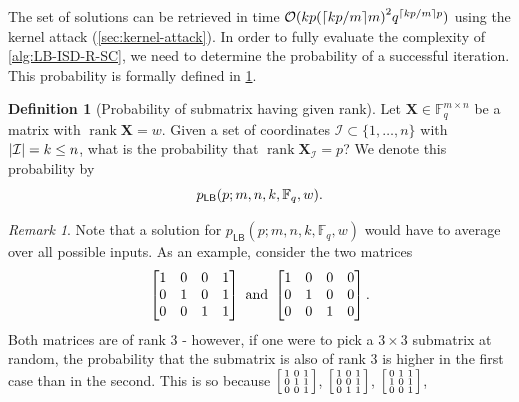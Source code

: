 \documentclass[version=last, paper=A4, parskip=half, oneside]{scrbook}
\theoremstyle{plain}
\theoremstyle{definition}
\newtheorem{definition}{Definition}
\theoremstyle{remark}
\newtheorem*{remark}{Remark}
\newcommand*{\mat}{\symbf}
\DeclareMathOperator{\rank}{rank}
\newcommand*{\FF}{\ensuremath{\mathbb{F}}}
\DeclarePairedDelimiter{\ceil}{\lceil}{\rceil}
\DeclarePairedDelimiter{\card}{\lvert}{\rvert}
\newcommand*{\LB}{\ensuremath{\mathsf{LB}}}
\begin{document}
The set of solutions can be retrieved in time
\(\mathcal{O}(k p {(\ceil{k p / {m}} m)}^2 q^{\ceil{k p / {m}} p})\) using the
kernel attack (\cref{sec:kernel-attack}).  In order to fully evaluate the
complexity of \cref{alg:LB-ISD-R-SC}, we need to determine the probability of a
successful iteration.  This probability is formally defined in
\cref{def:submatrix-rank-distribution}.

\begin{definition}[Probability of submatrix having given
  rank]\label{def:submatrix-rank-distribution}
  Let \(\mat{X} \in \FF_q^{m \times n}\) be a matrix with \(\rank \mat{X} = w\).
  Given a set of coordinates \(\mathcal{I} \subset \{1, \ldots, n\}\) with
  \(\card{\mathcal{I}} = k \le n\), what is the probability that
  \(\rank \mat{X}_{\mathcal{I}} = p\)?  We denote this probability by
  \[
    p_{\LB}(p; m, n, k, \FF_q, w)\text.
  \]
  \begin{remark}
    Note that a solution for \(p_{\LB}(p; m, n, k, \FF_q, w)\) would have to
    average over all possible inputs.  As an example, consider the two matrices
    \[
      \begin{bmatrix}
        1 & 0 & 0 & 1 \\
        0 & 1 & 0 & 1 \\
        0 & 0 & 1 & 1
      \end{bmatrix}\ \text{and}\
      \begin{bmatrix}
        1 & 0 & 0 & 0 \\
        0 & 1 & 0 & 0 \\
        0 & 0 & 1 & 0
      \end{bmatrix}\text.
    \]
    Both matrices are of rank \(3\) \--{} however, if one were to pick a
    \(3 \times 3\) submatrix at random, the probability that the submatrix is
    also of rank \(3\) is higher in the first case than in the second.  This is
    so because
    \(\begin{bsmallmatrix} 1 & 0 & 1 \\ 0 & 1 & 1 \\ 0 & 0 & 1 \end{bsmallmatrix}\),
    \(\begin{bsmallmatrix} 1 & 0 & 1 \\ 0 & 0 & 1 \\ 0 & 1 & 1 \end{bsmallmatrix}\),
    \(\begin{bsmallmatrix} 0 & 1 & 1 \\ 1 & 0 & 1 \\ 0 & 0 & 1 \end{bsmallmatrix}\),

\end{remark}
\end{definition}
\end{document}
